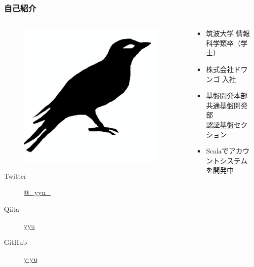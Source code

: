 \begin{frame}
  \frametitle{自己紹介}
  
  \begin{columns}
    \begin{column}{0.4\textwidth}
      \centering
      \begin{figure}
        \includegraphics[width=0.95\textwidth]{img/bird2x.png}
      \end{figure}

      \begin{description}
        \item[Twitter] \href{https://twitter.com/\_yyu\_}{@\_yyu\_}
        \item[Qiita] \href{http://qiita.com/yyu}{yyu}
        \item[GitHub] \href{https://github.com/y-yu}{y-yu}
      \end{description}
    \end{column}
    \begin{column}{0.6\textwidth}
      \begin{itemize}
        \item<2-> 筑波大学 情報科学類卒（学士）
        \item<3-> 株式会社ドワンゴ 入社
        \item<4-> 基盤開発本部 共通基盤開発部 \\
        認証基盤セクション
        \item<5-> Scalaでアカウントシステムを開発中
      \end{itemize}
    \end{column}
  \end{columns}
\end{frame}

